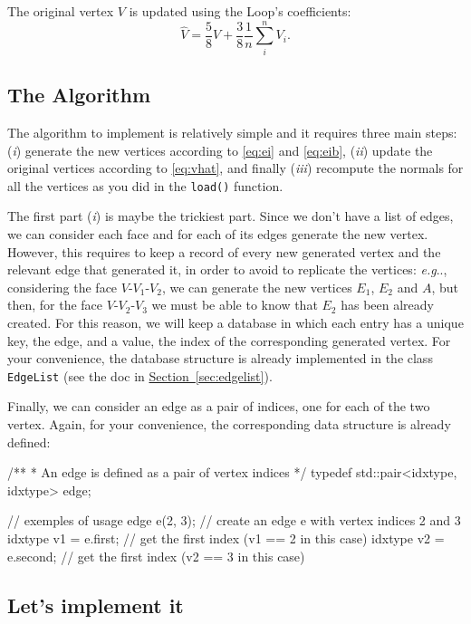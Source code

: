 \documentclass[a4paper,11pt]{article}
\makeatletter
\DeclareRobustCommand\onedot{\futurelet\@let@token\@onedot}
\def\@onedot{\ifx\@let@token.\else.\null\fi\xspace}
\def\eg{\emph{e.g}\onedot} \def\Eg{\emph{E.g}\onedot}
\newcommand{\hilight}[1]{\colorbox{bg}{#1}}
\newcommand{\coden}[1]{\texttt{#1}}
\newcommand{\code}[1]{\hilight{\texttt{#1}}}
\newcommand{\sect}[1]{\hyperref[#1]{\mbox{Section \ref*{#1}}}\xspace}
\makeatother
\begin{document}
\noindent The original vertex $V$ is updated using the Loop's coefficients:
\begin{equation} \label{eq:vhat}
\hat{V} = \frac{5}{8} V  + \frac{3}{8} \frac{1}{n} \sum_i^n V_i.
\end{equation} 


\subsection{The Algorithm}

The algorithm to implement is relatively simple and it requires three main steps: (\emph{i}) generate the new vertices according to \eqref{eq:ei} and \eqref{eq:eib}, (\emph{ii}) update the original vertices according to \eqref{eq:vhat}, and finally (\emph{iii}) recompute the normals for all the vertices as you did in the \coden{load()} function.

The first part (\emph{i}) is maybe the trickiest part. Since we don't have a list of edges, we can consider each face and for each of its edges generate the new vertex. However, this requires to keep a record of every new generated vertex and the relevant edge that generated it, in order to avoid to replicate the vertices: \eg, considering the face $V$-$V_1$-$V_2$, we can generate the new vertices $E_1$, $E_2$ and $A$, but then, for the face $V$-$V_2$-$V_3$ we must be able to know that $E_2$ has been already created. For this reason, we will keep a database in which each entry has a unique key, the edge, and a value, the index of the corresponding generated vertex. For your convenience, the database structure is already implemented in the class \code{EdgeList} (see the doc in \sect{sec:edgelist}).

Finally, we can consider an edge as a pair of indices, one for each of the two vertex. Again, for your convenience, the corresponding data structure is already defined:


{\smaller
\begin{cppcode}
/**
 * An edge is defined as a pair of vertex indices 
 */
typedef std::pair<idxtype, idxtype> edge;

// exemples of usage
edge e(2, 3);           // create an edge e with vertex indices 2 and 3
idxtype v1 = e.first;   // get the first index (v1 == 2 in this case)
idxtype v2 = e.second;  // get the first index (v2 == 3 in this case)
\end{cppcode}
}


\subsection{Let's implement it}
\end{document}
